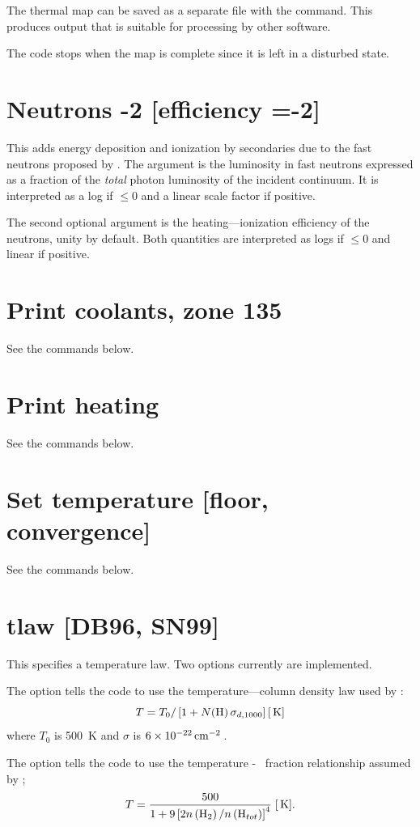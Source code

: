 The thermal map can be saved as a separate file with the
 command.
This produces output that is suitable for
processing by other software.

The code stops when the map is complete since it is left in a disturbed
state.

\section{Neutrons -2 [efficiency =-2]}

This adds energy deposition and ionization by secondaries due to the
fast neutrons proposed by \citet{Sikora1989}.
The argument
is the luminosity in fast neutrons expressed as a fraction of the
\emph{total} photon luminosity of the incident continuum.
It is interpreted as a log
if $\le 0$ and a linear scale factor if positive.

The second optional argument is the heating---ionization efficiency
of the neutrons, unity by default.
Both quantities are interpreted as logs
if $\le 0$ and linear if positive.

\section{Print coolants, zone 135}

See the  commands below.

\section{Print heating}

See the  commands below.

\section{Set temperature [floor, convergence]}

See the  commands below.

\section{tlaw [DB96, SN99]}

This specifies a temperature law.
Two options currently are implemented.

The  option tells the code to use
the temperature---column density
law used by \citet{Draine1996}:
\begin{equation}
T = T_0 /\left[ {1 + N({\mathrm{H}})\,\sigma _{d{,}1000} } \right]
 [{\rm\thinspace K} ]
\end{equation}
where $T_0$ is 500~K and $\sigma$ is $6\times 10^{-22} \mbox{${\rm\thinspace cm}^{-2}\,$}$.

The  option tells the code to use
the temperature - \htwo\ fraction
relationship assumed by \citet{Sternberg1999};
\begin{equation}
T = \frac{{500}}{{1 + 9\left[ {2n\left( {{\mathrm{H}}_2 } \right)/n\left(
{{\mathrm{H}}_{tot} } \right)} \right]^4 }}
 \; [{\rm\thinspace K}].
\end{equation}


